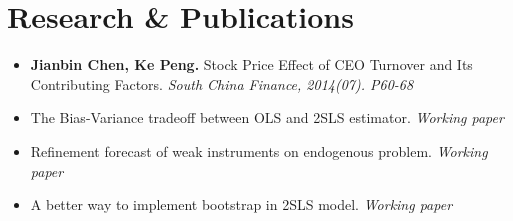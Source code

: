 \documentclass[a4paper,12pt]{article}
\makeatletter
\newenvironment{joblong}[2]
    {
    \begin{tabularx}{\linewidth}{@{}l X r@{}}
    \textbf{#1} & \hfill &  #2 \\[3.75pt]
    \end{tabularx}
    \begin{minipage}[t]{\linewidth}
    \begin{itemize}[nosep,after=\strut, leftmargin=1em, itemsep=3pt,label=--]
    }
    {
    \end{itemize}
    \end{minipage}    
    }
\makeatother
\begin{document}
  



\vspace{-10pt}
\section{Research \& Publications}
\vspace{-5pt}
\begin{itemize}[nolistsep,topsep=-2pt]
\item \textbf{Jianbin Chen, Ke Peng.} Stock Price Effect of CEO Turnover and Its Contributing Factors. \textit{South China Finance, 2014(07). P60-68}
\item The Bias-Variance tradeoff between OLS and 2SLS estimator. \textit{Working paper}
\item Refinement forecast of weak instruments on endogenous problem. \textit{Working paper}
\item A better way to implement bootstrap in 2SLS model. \textit{Working paper}
\end{itemize}
\end{document}
